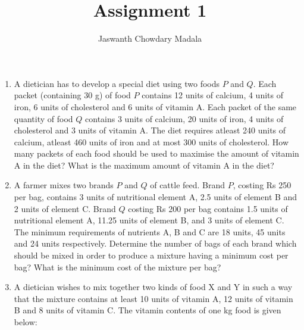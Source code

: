 \documentclass[journal,12pt,twocolumn]{IEEEtran}
\begin{document}
\vspace{3cm}


\title{Assignment 1}
\author{Jaswanth Chowdary Madala}





\maketitle

\newpage


\bigskip

\renewcommand{\thefigure}{\theenumi}
\renewcommand{\thetable}{\theenumi}



\begin{enumerate}
\item A dietician has to develop a special diet using two foods $P$ and $Q$. Each packet (containing 30 g) of food $P$ contains 12 units of calcium, 4 units of iron, 6 units of cholesterol and 6 units of vitamin A. Each packet of the same quantity of food $Q$ contains 3 units of calcium, 20 units of iron, 4 units of cholesterol and 3 units of vitamin A. The diet requires atleast 240 units of calcium, atleast 460 units of iron and at most 300 units of cholesterol. How many packets of each food should be used to maximise the amount of vitamin A in the diet? What is the maximum amount of vitamin A in the diet?

\item A farmer mixes two brands $P$ and $Q$ of cattle feed. Brand $P$, costing Rs 250 per bag, contains 3 units of nutritional element A, 2.5 units of element B and 2 units of element C. Brand $Q$ costing Rs 200 per bag contains 1.5 units of nutritional element A, 11.25 units of element B, and 3 units of element C. The minimum requirements of nutrients A, B and C are 18 units, 45 units and 24 units respectively. Determine the number of bags of each brand which should be mixed in order to produce a mixture having a minimum cost per bag? What is the minimum cost of the mixture per bag?

\item A dietician wishes to mix together two kinds of food X and Y in such a way that the mixture contains at least 10 units of vitamin A, 12 units of vitamin B and 8 units of vitamin C. The vitamin contents of one kg food is given below:

\begin{table}[h]
\centering

\caption{}
\end{table}


\end{enumerate}
\end{document}
